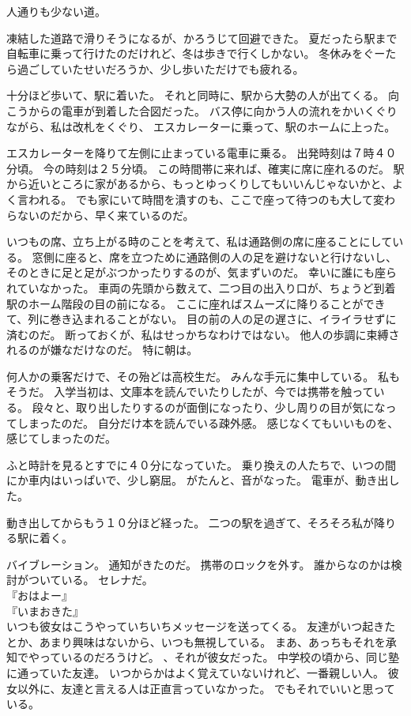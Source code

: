 \documentclass[../IHMain]{subfiles}
\begin{document}
人通りも少ない道。

凍結した道路で滑りそうになるが、かろうじて回避できた。
夏だったら駅まで自転車に乗って行けたのだけれど、冬は歩きで行くしかない。
冬休みをぐーたら過ごしていたせいだろうか、少し歩いただけでも疲れる。

十分ほど歩いて、駅に着いた。
それと同時に、駅から大勢の人が出てくる。
向こうからの電車が到着した合図だった。
バス停に向かう人の流れをかいくぐりながら、私は改札をくぐり、
エスカレーターに乗って、駅のホームに上った。

エスカレーターを降りて左側に止まっている電車に乗る。
出発時刻は７時４０分頃。
今の時刻は２５分頃。
この時間帯に来れば、確実に席に座れるのだ。
駅から近いところに家があるから、もっとゆっくりしてもいいんじゃないかと、よく言われる。
でも家にいて時間を潰すのも、ここで座って待つのも大して変わらないのだから、早く来ているのだ。

いつもの席、立ち上がる時のことを考えて、私は通路側の席に座ることにしている。
窓側に座ると、席を立つために通路側の人の足を避けないと行けないし、
そのときに足と足がぶつかったりするのが、気まずいのだ。
幸いに誰にも座られていなかった。
車両の先頭から数えて、二つ目の出入り口が、ちょうど到着駅のホーム階段の目の前になる。
ここに座ればスムーズに降りることができて、列に巻き込まれることがない。
目の前の人の足の遅さに、イライラせずに済むのだ。
断っておくが、私はせっかちなわけではない。
他人の歩調に束縛されるのが嫌なだけなのだ。
特に朝は。

何人かの乗客だけで、その殆どは高校生だ。
みんな手元に集中している。
私もそうだ。
入学当初は、文庫本を読んでいたりしたが、今では携帯を触っている。
段々と、取り出したりするのが面倒になったり、少し周りの目が気になってしまったのだ。
自分だけ本を読んでいる疎外感。
感じなくてもいいものを、感じてしまったのだ。

ふと時計を見るとすでに４０分になっていた。
乗り換えの人たちで、いつの間にか車内はいっぱいで、少し窮屈。
がたんと、音がなった。
電車が、動き出した。

動き出してからもう１０分ほど経った。
二つの駅を過ぎて、そろそろ私が降りる駅に着く。

バイブレーション。
通知がきたのだ。
携帯のロックを外す。
誰からなのかは検討がついている。
セレナだ。\\
『おはよー』\\
『いまおきた』\\
いつも彼女はこうやっていちいちメッセージを送ってくる。
友達がいつ起きたとか、あまり興味はないから、いつも無視している。
まあ、あっちもそれを承知でやっているのだろうけど。
、それが彼女だった。
中学校の頃から、同じ塾に通っていた友達。
いつからかはよく覚えていないけれど、一番親しい人。
彼女以外に、友達と言える人は正直言っていなかった。
でもそれでいいと思っている。
\end{document}
